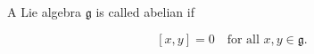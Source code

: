 A Lie algebra $\mathfrak{g}$ is called abelian if

$$[x, y] = 0 \quad \text{for all } x, y \in \mathfrak{g}.$$
